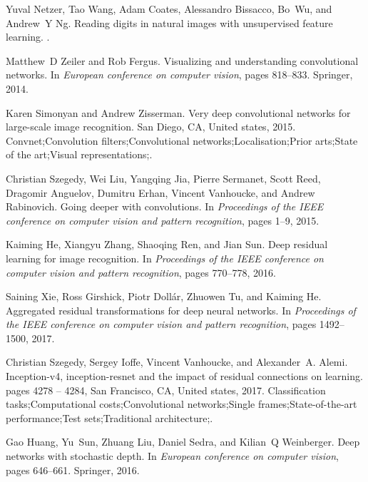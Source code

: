 \documentclass[10pt,twocolumn,letterpaper]{article}
\begin{document}
{\begin{thebibliography}{10}
Yuval Netzer, Tao Wang, Adam Coates, Alessandro Bissacco, Bo~Wu, and Andrew~Y
  Ng.
\newblock Reading digits in natural images with unsupervised feature learning.
.


Matthew~D Zeiler and Rob Fergus.
\newblock Visualizing and understanding convolutional networks.
\newblock In {\em European conference on computer vision}, pages 818--833.
  Springer, 2014.

Karen Simonyan and Andrew Zisserman.
\newblock Very deep convolutional networks for large-scale image recognition.
\newblock San Diego, CA, United states, 2015.
\newblock Convnet;Convolution filters;Convolutional networks;Localisation;Prior
  arts;State of the art;Visual representations;.

Christian Szegedy, Wei Liu, Yangqing Jia, Pierre Sermanet, Scott Reed, Dragomir
  Anguelov, Dumitru Erhan, Vincent Vanhoucke, and Andrew Rabinovich.
\newblock Going deeper with convolutions.
\newblock In {\em Proceedings of the IEEE conference on computer vision and
  pattern recognition}, pages 1--9, 2015.


Kaiming He, Xiangyu Zhang, Shaoqing Ren, and Jian Sun.
\newblock Deep residual learning for image recognition.
\newblock In {\em Proceedings of the IEEE conference on computer vision and
  pattern recognition}, pages 770--778, 2016.



Saining Xie, Ross Girshick, Piotr Doll{\'a}r, Zhuowen Tu, and Kaiming He.
\newblock Aggregated residual transformations for deep neural networks.
\newblock In {\em Proceedings of the IEEE conference on computer vision and
  pattern recognition}, pages 1492--1500, 2017.



Christian Szegedy, Sergey Ioffe, Vincent Vanhoucke, and Alexander~A. Alemi.
\newblock Inception-v4, inception-resnet and the impact of residual connections
  on learning.
\newblock pages 4278 -- 4284, San Francisco, CA, United states, 2017.
\newblock Classification tasks;Computational costs;Convolutional
  networks;Single frames;State-of-the-art performance;Test sets;Traditional
  architecture;.


Gao Huang, Yu~Sun, Zhuang Liu, Daniel Sedra, and Kilian~Q Weinberger.
\newblock Deep networks with stochastic depth.
\newblock In {\em European conference on computer vision}, pages 646--661.
  Springer, 2016.




\end{thebibliography}}
\end{document}
